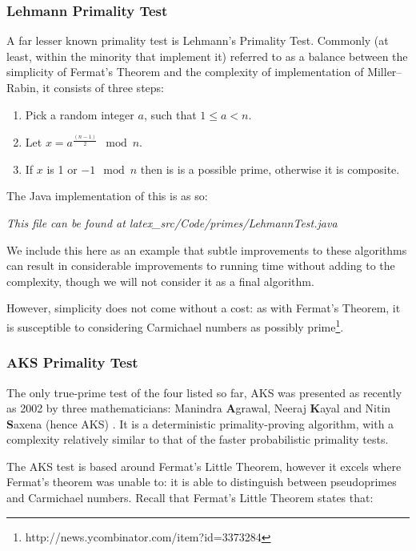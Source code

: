     \subsubsection{Lehmann Primality Test}
    
    A far lesser known primality test is Lehmann's Primality Test. Commonly (at least, within the minority that implement it) referred to as a balance between the simplicity of Fermat's Theorem and the complexity of implementation of Miller--Rabin, it consists of three steps:
    
    \begin{enumerate}
      \item Pick a random integer $a$, such that $1 \leq a < n$.
      \item Let $x = a^{\frac{(n-1)}{2}} \mod n$.
      \item If $x$ is 1 or $-1 \mod n$ then is is a possible prime, otherwise it is composite.
    \end{enumerate}
    
    The Java implementation of this is as so:
    
    \emph{This file can be found at latex\_src/Code/primes/LehmannTest.java}
    
    We include this here as an example that subtle improvements to these algorithms can result in considerable improvements to running time\cite{Kendal:2012rt} without adding to the complexity, though we will not consider it as a final algorithm.
    
    However, simplicity does not come without a cost: as with Fermat's Theorem, it is susceptible to considering Carmichael numbers as possibly prime\footnote{http://news.ycombinator.com/item?id=3373284}.
    
    \subsubsection{AKS Primality Test}
    
    The only true-prime test of the four listed so far, AKS was presented as recently as 2002 by three mathematicians: Manindra \textbf{A}grawal, Neeraj \textbf{K}ayal and Nitin \textbf{S}axena (hence AKS) \cite{Agrawal:2002aa}. It is a deterministic primality-proving algorithm, with a complexity relatively similar to that of the faster probabilistic primality tests.
    
    The AKS test is based around Fermat's Little Theorem, however it excels where Fermat's theorem was unable to: it is able to distinguish between pseudoprimes and Carmichael numbers. Recall that Fermat's Little Theorem states that: 
    
